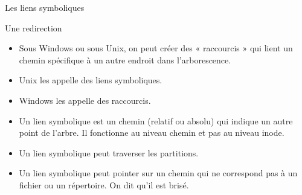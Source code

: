 \begin{frame}{Les liens symboliques}
  \begin{block}{Une redirection}
    \begin{itemize}
    \item[\ddialogsystem] Sous Windows ou sous Unix, on peut créer des «
      raccourcis » qui lient un chemin spécifique à un autre endroit
      dans l'arborescence.
    \item Unix les appelle des liens symboliques.
    \item Windows les appelle des raccourcis.
    \item Un lien symbolique est un chemin (relatif ou absolu) qui
      indique un autre point de l'arbre. Il fonctionne au niveau chemin
      et pas au niveau inode.
    \item Un lien symbolique peut traverser les partitions.
    \item[\ddialogwarning] Un lien symbolique peut pointer sur un chemin
      qui ne correspond pas à un fichier ou un répertoire. On dit qu'il
      est brisé.
    \end{itemize}
  \end{block}
\end{frame}


